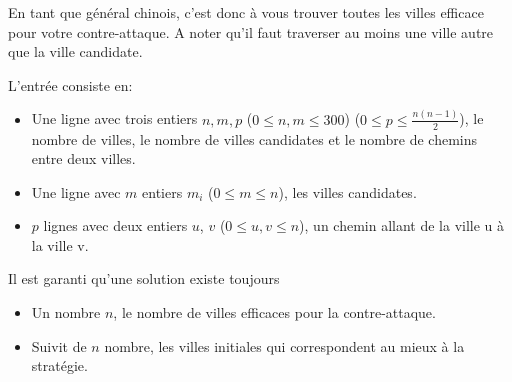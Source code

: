 En tant que général chinois, c'est donc à vous trouver toutes les villes efficace pour votre contre-attaque. A noter qu'il faut traverser au moins une ville autre que la ville candidate.

\begin{Input}
    L'entrée consiste en:
    \begin{itemize}
        \item Une ligne avec trois entiers $n, m, p$ ($0\leq n, m\leq 300$) ($0 \leq p \leq \frac{n (n-1)}{2}$), le nombre de villes, le nombre de villes candidates et le nombre de chemins entre deux villes.
        \item Une ligne avec $m$ entiers $m_i$ ($0 \leq m \leq n$), les villes candidates.
        \item $p$ lignes avec deux entiers $u$, $v$ ($0 \leq u, v \leq n$), un chemin allant de la ville u à la ville v.
    \end{itemize}
    Il est garanti qu'une solution existe toujours
\end{Input}

\begin{Output}
    \begin{itemize}
        \item Un nombre $n$, le nombre de villes efficaces pour la contre-attaque.
        \item Suivit de $n$ nombre, les villes initiales qui correspondent au mieux à la stratégie.
    \end{itemize}
\end{Output}
